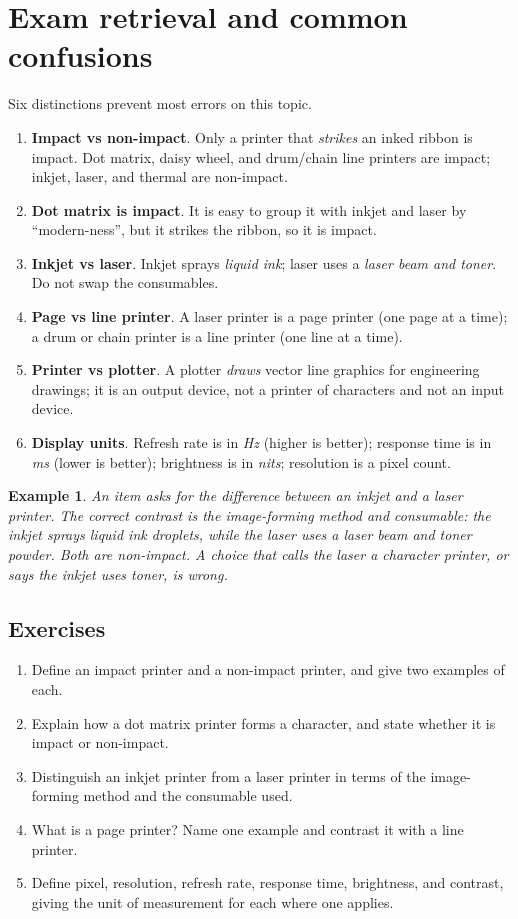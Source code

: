 \documentclass[11pt]{article}
\newtheorem{example}{Example}[section]
\begin{document}
\section{Exam retrieval and common confusions}
Six distinctions prevent most errors on this topic.
\begin{enumerate}
  \item \textbf{Impact vs non-impact}. Only a printer that \emph{strikes} an
    inked ribbon is impact. Dot matrix, daisy wheel, and drum/chain line
    printers are impact; inkjet, laser, and thermal are non-impact.
  \item \textbf{Dot matrix is impact}. It is easy to group it with inkjet and
    laser by ``modern-ness'', but it strikes the ribbon, so it is impact.
  \item \textbf{Inkjet vs laser}. Inkjet sprays \emph{liquid ink}; laser uses
    a \emph{laser beam and toner}. Do not swap the consumables.
  \item \textbf{Page vs line printer}. A laser printer is a page printer
    (one page at a time); a drum or chain printer is a line printer (one line
    at a time).
  \item \textbf{Printer vs plotter}. A plotter \emph{draws} vector line
    graphics for engineering drawings; it is an output device, not a printer
    of characters and not an input device.
  \item \textbf{Display units}. Refresh rate is in \emph{Hz} (higher is
    better); response time is in \emph{ms} (lower is better); brightness is
    in \emph{nits}; resolution is a pixel count.
\end{enumerate}

\begin{example}
An item asks for the difference between an inkjet and a laser printer. The
correct contrast is the image-forming method and consumable: the inkjet sprays
liquid ink droplets, while the laser uses a laser beam and toner powder.
Both are non-impact. A choice that calls the laser a character printer, or
says the inkjet uses toner, is wrong.
\end{example}

\subsection*{Exercises}
\begin{enumerate}[label=\arabic*.]
  \item Define an impact printer and a non-impact printer, and give two
    examples of each.
  \item Explain how a dot matrix printer forms a character, and state whether
    it is impact or non-impact.
  \item Distinguish an inkjet printer from a laser printer in terms of the
    image-forming method and the consumable used.
  \item What is a page printer? Name one example and contrast it with a line
    printer.
  \item Define pixel, resolution, refresh rate, response time, brightness,
    and contrast, giving the unit of measurement for each where one applies.
\end{enumerate}
\end{document}
